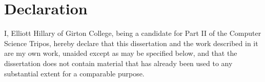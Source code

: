 \chapter*{Declaration}

I, Elliott Hillary of Girton College, being a candidate for Part II of
the Computer Science Tripos, hereby declare that this dissertation and
the work described in it are my own work, unaided except as may be
specified below, and that the dissertation does not contain material
that has already been used to any substantial extent for a comparable
purpose. 

\bigskip
{}

\medskip
{}
